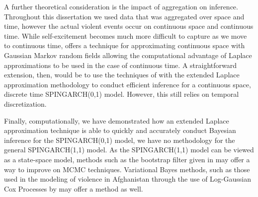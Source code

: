 \documentclass[11pt]{isuthesis}
\begin{document}
	A further theoretical consideration is the impact of aggregation on inference.  Throughout this dissertation we used data that was aggregated over space and time, however the actual violent events occur on continuous space and continuous time.  While self-excitement becomes much more difficult to capture as we move to continuous time, \cite{lindgren2011explicit} offers a technique for approximating continuous space with Gaussian Markov random fields allowing the computational advantage of Laplace approximations to be used in the case of continuous time.  A straightforward extension, then, would be to use the techniques of \cite{lindgren2011explicit} with the extended Laplace approximation methodology to conduct efficient inference for a continuous space, discrete time SPINGARCH(0,1) model.  However, this still relies on temporal discretization.
	
	Finally, computationally, we have demonstrated how an extended Laplace approximation technique is able to quickly and accurately conduct Bayesian inference for the SPINGARCH(0,1) model, we have no methodology for the general SPINGARCH(1,1) model.  As the SPINGARCH(1,1) model can be viewed as a state-space model, methods such as the bootstrap filter given in \cite{doucet_de_freitas_gordon_2010} may offer a way to improve on MCMC techniques.  Variational Bayes methods, such as those used in the modeling of violence in Afghanistan through the use of Log-Gaussian Cox Processes by \cite{zammit2013modeling} may offer a method as well.







%
%
%
%

\renewcommand{\bibname}{\centerline{BIBLIOGRAPHY}}
\unappendixtitle
\newpage
{}
{}

\end{document}
